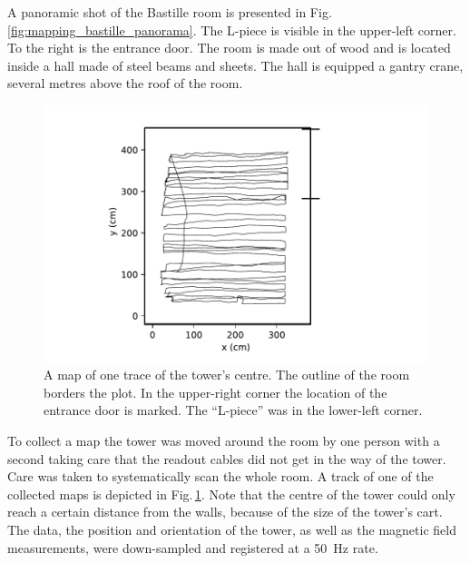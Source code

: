 A panoramic shot of the Bastille room is presented in Fig.\,\ref{fig:mapping_bastille_panorama}.
The L-piece is visible in the upper-left corner.
To the right is the entrance door.
The room is made out of wood and is located  inside a hall made of steel beams and sheets.
The hall is equipped a gantry crane, several metres above the roof of the room.


\begin{figure}
  \centering
  \includegraphics[width=0.5\linewidth]{gfx/mapping/lpsc/bastille_crane_away_rep_track_crop.pdf}
  \caption{A map of one trace of the tower's centre.
  The outline of the room borders the plot.
  In the upper-right corner the location of the entrance door is marked.
  The ``L-piece'' was in the lower-left corner.}\label{fig:mapping_bastille_track}
\end{figure}

To collect a map the tower was moved around the room by one person with a second taking care that the readout cables did not get in the way of the tower.
Care was taken to systematically scan the whole room.
A track of one of the collected maps is depicted in Fig.\,\ref{fig:mapping_bastille_track}.
Note that the centre of the tower could only reach a certain distance from the walls, because of the size of the tower's cart.
The data, the position and orientation of the tower, as well as the magnetic field measurements, were down-sampled and registered at a \SI{50}{\hertz} rate.

